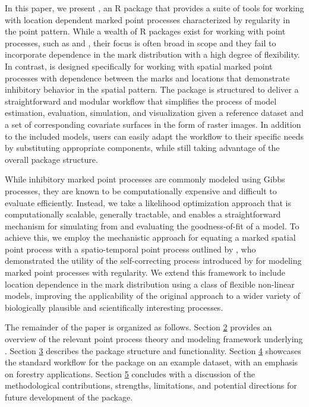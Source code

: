 In this paper, we present  \citep{drewLdmpprEstimateSimulate2025a}, an R package that provides a
suite of tools for working with location dependent marked point
processes characterized by regularity in the point pattern. While a
wealth of R packages exist for working with point processes, such as
 \citep{baddeleySpatstatPackageAnalyzing2005} and
 \citep{hartePtProcessPackageModelling2010}, their focus
is often broad in scope and they fail to incorporate dependence in the
mark distribution with a high degree of flexibility. In contrast,
 is designed specifically for working with spatial marked
point processes with dependence between the marks and locations that
demonstrate inhibitory behavior in the spatial pattern. The package is
structured to deliver a straightforward and modular workflow that
simplifies the process of model estimation, evaluation, simulation, and
visualization given a reference dataset and a set of corresponding
covariate surfaces in the form of raster images. In addition to the
included models, users can easily adapt the workflow to their specific
needs by substituting appropriate components, while still taking
advantage of the overall package structure.

While inhibitory marked point processes are commonly modeled using Gibbs
processes, they are known to be computationally expensive and difficult
to evaluate efficiently. Instead, we take a likelihood optimization
approach that is computationally scalable, generally tractable, and
enables a straightforward mechanism for simulating from and evaluating
the goodness-of-fit of a model. To achieve this, we employ the
mechanistic approach for equating a marked spatial point process with a
spatio-temporal point process outlined by
\citet{mollerMechanisticSpatiotemporalPoint2016a}, who demonstrated the utility
of the self-correcting process introduced by
\citet{ishamSelfcorrectingPointProcess1979} for modeling marked point processes
with regularity. We extend this framework to include location dependence
in the mark distribution using a class of flexible non-linear models,
improving the applicability of the original approach to a wider variety
of biologically plausible and scientifically interesting processes.

The remainder of the paper is organized as follows. Section \hyperref[sec:background]{2} provides an overview of the relevant point process
theory and modeling framework underlying . Section \hyperref[sec:package]{3} describes the package structure and functionality.
Section \hyperref[sec:application]{4} showcases the standard workflow for the
package on an example dataset, with an emphasis on forestry
applications. Section \hyperref[sec:discussion]{5} concludes with a discussion
of the methodological contributions, strengths, limitations, and
potential directions for future development of the package.

